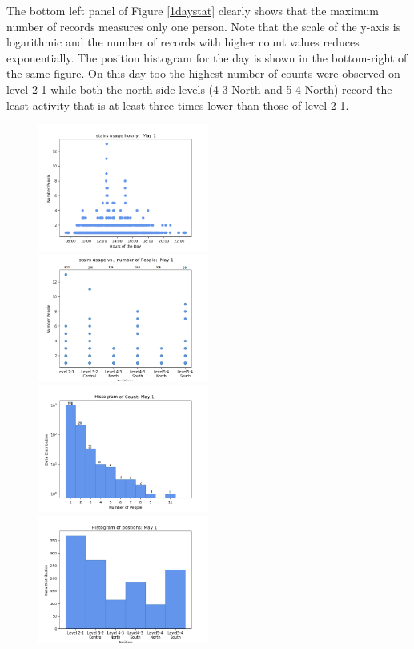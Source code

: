 \documentclass[../UNBThesis2.tex]{subfiles}
\begin{document}
The bottom left panel of Figure \ref{1daystat} clearly shows that the maximum number of records measures only one person. Note that the scale of the y-axis is logarithmic and the number of records with higher count values reduces exponentially. The position histogram for the day is shown in the bottom-right of the same figure. On this day too the highest number of counts were observed on level 2-1 while both the north-side levels (4-3 North and 5-4 North) record the least activity that is at least three times lower than those of level 2-1. 

\begin{figure}[!h]
    \centering
   
    \includegraphics[width=0.5\textwidth]{image/Chapters/Chapter6/onedayhourMay1.png}\hfill
    \includegraphics[width=0.5\textwidth]{image/Chapters/Chapter6/1day1monday1InterventionD.png}\hfill
    \includegraphics[width=0.5\textwidth]{image/Chapters/Chapter6/oneweekCountApril.png}\hfill 
    \includegraphics[width=0.5\textwidth]{image/Chapters/Chapter6/oneweek(Monday)Hist.png}

\end{figure}
\end{document}
